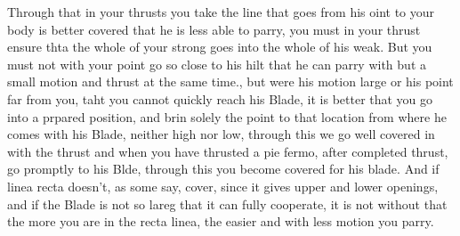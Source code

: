 \newpage


\newpage



Through that in your thrusts you take the line that goes from his oint
to your body is better covered that he is less able to parry, you must
in your thrust ensure thta the whole of your strong goes into the
whole of his weak. But you must not with your point go so close to his
hilt that he can parry with but a small motion and thrust at the same
time., but were his motion large or his point far from you, taht you
cannot quickly reach his Blade, it is better that you go into a
prpared position, and brin solely the point to that location from
where he comes with his Blade, neither high nor low, through this we
go well covered in with the thrust and when you have thrusted a pie
fermo, after completed thrust, go promptly to his Blde, through this
you become covered for his blade. And if linea recta doesn't, as some
say, cover, since it gives upper and lower openings, and if the Blade
is not so lareg that it can fully cooperate, it is not without that
the more you are in the recta linea, the easier and with less motion
you parry.


